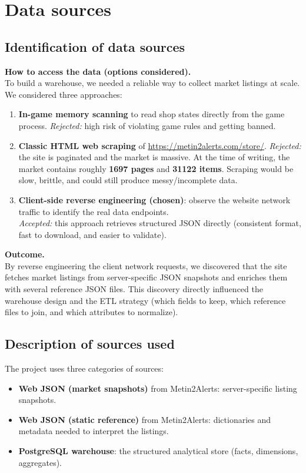 \chapter{Data sources}

\section{Identification of data sources}

\begin{challengebox}
	\textbf{How to access the data (options considered).} \\[0.25em]
To build a warehouse, we needed a reliable way to collect market listings at scale.
We considered three approaches:
\begin{enumerate}
	\item \textbf{In-game memory scanning} to read shop states directly from the game process.
	\textit{Rejected:} high risk of violating game rules and getting banned.

	\item \textbf{Classic HTML web scraping} of \url{https://metin2alerts.com/store/}.
	\textit{Rejected:} the site is paginated and the market is massive.
	At the time of writing, the market contains roughly \textbf{1697 pages} and \textbf{31122 items}.
	Scraping would be slow, brittle, and could still produce messy/incomplete data.

	\item \textbf{Client-side reverse engineering (chosen)}: observe the website network traffic to identify the real data endpoints.
	\\
		\textit{Accepted:} this approach retrieves structured JSON directly (consistent format, fast to download, and easier to validate).
\end{enumerate}

	\textbf{Outcome.} \\[0.25em]

By reverse engineering the client network requests, we discovered that the site fetches market listings from server-specific JSON snapshots and enriches them with several reference JSON files.
This discovery directly influenced the warehouse design and the ETL strategy (which fields to keep, which reference files to join, and which attributes to normalize).
\end{challengebox}

\section{Description of sources used}
The project uses three categories of sources:
\begin{itemize}
  \item \textbf{Web JSON (market snapshots)} from Metin2Alerts: server-specific listing snapshots.
  \item \textbf{Web JSON (static reference)} from Metin2Alerts: dictionaries and metadata needed to interpret the listings.
  \item \textbf{PostgreSQL warehouse}: the structured analytical store (facts, dimensions, aggregates).
\end{itemize}

